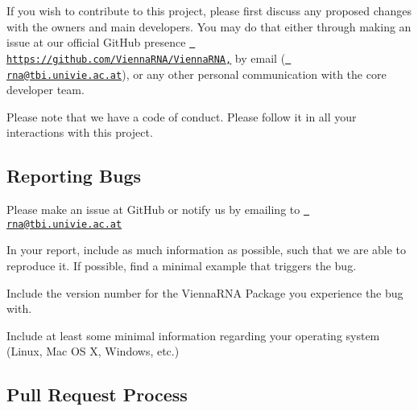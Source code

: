 If you wish to contribute to this project, please first discuss any proposed changes with the owners and main developers. You may do that either through making an issue at our official Git\+Hub presence \href{https://github.com/ViennaRNA/ViennaRNA,}{\texttt{ https\+://github.\+com/\+Vienna\+R\+N\+A/\+Vienna\+R\+N\+A,}} by email (\href{mailto:rna@tbi.univie.ac.at}{\texttt{ rna@tbi.\+univie.\+ac.\+at}}), or any other personal communication with the core developer team.

Please note that we have a code of conduct. Please follow it in all your interactions with this project.

\subsection*{Reporting Bugs}


\begin{DoxyEnumerate}
\item Please make an issue at Git\+Hub or notify us by emailing to \href{mailto:rna@tbi.univie.ac.at}{\texttt{ rna@tbi.\+univie.\+ac.\+at}}
\item In your report, include as much information as possible, such that we are able to reproduce it. If possible, find a minimal example that triggers the bug.
\item Include the version number for the Vienna\+R\+NA Package you experience the bug with.
\item Include at least some minimal information regarding your operating system (Linux, Mac OS X, Windows, etc.)
\end{DoxyEnumerate}

\subsection*{Pull Request Process}


